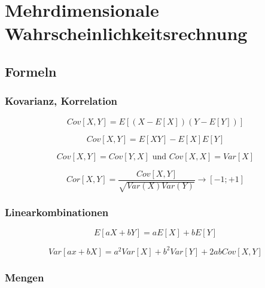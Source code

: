 \section{Mehrdimensionale Wahrscheinlichkeitsrechnung}

\subsection{Formeln}

\subsubsection{Kovarianz, Korrelation}
\begin{equation*}
    Cov[X,Y]=E[(X-E[X])(Y-E[Y])]
\end{equation*}

\begin{equation*}
    Cov[X,Y]=E[XY]-E[X]E[Y]
\end{equation*}

\begin{equation*}
    Cov[X,Y]=Cov[Y,X] \text{ und } Cov[X,X]=Var[X]
\end{equation*}

\begin{equation*}
    Cor[X,Y]=\frac{Cov[X,Y]}{\sqrt{Var(X)Var(Y)}} \rightarrow [-1;+1]
\end{equation*}

\subsubsection{Linearkombinationen}
\begin{equation*}
    E[aX+bY]=aE[X]+bE[Y]
\end{equation*}

\begin{equation*}
    Var[ax+bX]=a^2Var[X]+b^2Var[Y]+2abCov[X,Y]
\end{equation*}

\subsubsection{Mengen}

